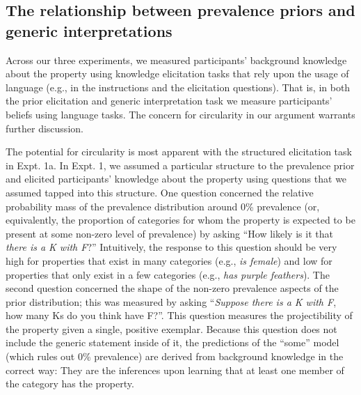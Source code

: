 \documentclass[floatsintext,doc]{apa6}
\theoremstyle{definition}
\theoremstyle{definition}
\theoremstyle{definition}
\theoremstyle{remark}
\begin{document}

\subsection{The relationship between prevalence priors and generic
interpretations}\label{the-relationship-between-prevalence-priors-and-generic-interpretations}

Across our three experiments, we measured participants' background
knowledge about the property using knowledge elicitation tasks that rely
upon the usage of language (e.g., in the instructions and the
elicitation questions). That is, in both the prior elicitation and
generic interpretation task we measure participants' beliefs using
language tasks. The concern for circularity in our argument warrants
further discussion.

The potential for circularity is most apparent with the structured
elicitation task in Expt. 1a. In Expt. 1, we assumed a particular
structure to the prevalence prior and elicited participants' knowledge
about the property using questions that we assumed tapped into this
structure. One question concerned the relative probability mass of the
prevalence distribution around 0\% prevalence (or, equivalently, the
proportion of categories for whom the property is expected to be present
at some non-zero level of prevalence) by asking \enquote{How likely is
it that \emph{there is a K with F}?} Intuitively, the response to this
question should be very high for properties that exist in many
categories (e.g., \emph{is female}) and low for properties that only
exist in a few categories (e.g., \emph{has purple feathers}). The second
question concerned the shape of the non-zero prevalence aspects of the
prior distribution; this was measured by asking \enquote{\emph{Suppose
there is a K with F}, how many Ks do you think have F?}. This question
measures the projectibility of the property given a single, positive
exemplar. Because this question does not include the generic statement
inside of it, the predictions of the \enquote{some} model (which rules
out 0\% prevalence) are derived from background knowledge in the correct
way: They are the inferences upon learning that at least one member of
the category has the property.
\end{document}
